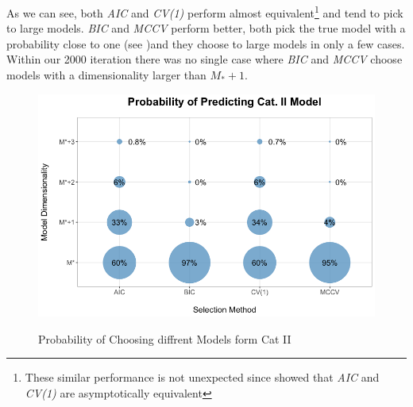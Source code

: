 \documentclass[Research_Module_ES.tex]{subfiles}
\begin{document}
As we can see, both \textit{AIC} and \textit{CV(1)} perform almost equivalent\footnote{These similar performance is not unexpected since \cite{stone1977asymptotic} showed that \textit{AIC} and \textit{CV(1)} are asymptotically equivalent} and tend to pick to large models. \textit{BIC} and \textit{MCCV}  perform better, both pick the true model with a probability close to one (see \cite{schwarz1978estimating})and they choose to large models in only a few cases. Within our 2000 iteration there was no single case where \textit{BIC} and \textit{MCCV} choose models with a dimensionality larger than $M_\ast+1$.
\begin{figure}[!h]
	\centering
	\includegraphics[width=1\textwidth]{Simulation2.png}\\
	\caption{Probability of Choosing diffrent Models form Cat II}\label{Simulation2}
\end{figure}
\end{document}

